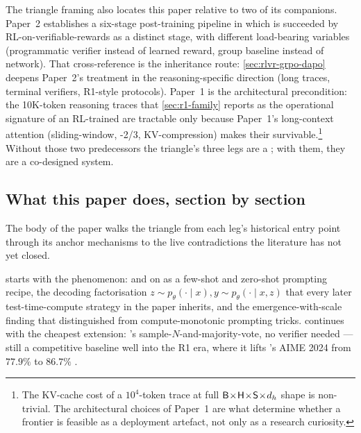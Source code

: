 The triangle framing also locates this paper relative to two of its
companions. Paper~2 establishes a six-stage post-training pipeline in
which  is succeeded by RL-on-verifiable-rewards as a distinct
stage, with different load-bearing variables (programmatic verifier
instead of learned reward, group baseline instead of  network).
That cross-reference is the inheritance route: \cref{sec:rlvr-grpo-dapo}
deepens Paper~2's  treatment in the reasoning-specific direction
(long traces, terminal verifiers, R1-style protocols). Paper~1 is the
architectural precondition: the 10K-token reasoning traces that
\cref{sec:r1-family} reports as the operational signature of an
RL-trained  are tractable only because Paper~1's
long-context attention (sliding-window, -2/3,
KV-compression) makes their  survivable.\footnote{The
KV-cache cost of a $10^4$-token trace at full $\mathsf{B}\!\times\!\mathsf{H}\!\times\!\mathsf{S}\!\times\!d_h$ shape is
non-trivial. The architectural choices of Paper~1 are what determine
whether a frontier  is feasible as a deployment
artefact, not only as a research curiosity.} Without those two
predecessors the triangle's three legs are a ; with them,
they are a co-designed system.

\subsection{What this paper does, section by section}
\label{sec:intro-roadmap}

The body of the paper walks the triangle from each leg's historical
entry point through its anchor mechanisms to the live contradictions
the literature has not yet closed.

 starts with the phenomenon: \citet{wei2022-cot}
and \citet{kojima2022} on  as a few-shot and zero-shot
prompting recipe, the decoding factorisation $z \sim p_\theta(\cdot
\mid x), y \sim p_\theta(\cdot \mid x, z)$ that every later
test-time-compute strategy in the paper inherits, and the
emergence-with-scale finding that distinguished  from
compute-monotonic prompting tricks. 
continues with the cheapest extension: \citet{wang2022-self-consistency}'s
sample-$N$-and-majority-vote, no verifier needed --- still a competitive
baseline well into the R1 era, where it lifts 's AIME 2024 from
$77.9\%$ to $86.7\%$ \citep[\S 2.3]{deepseek-r1}.

